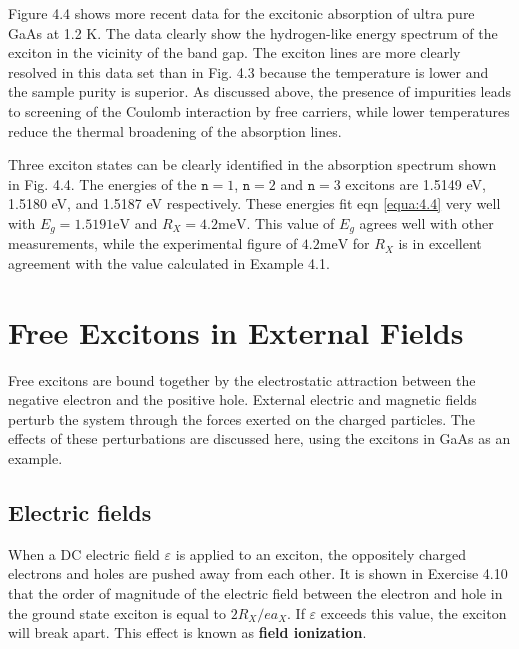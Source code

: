 \documentclass[12pt]{book}
\begin{document}
Figure 4.4 shows more recent data for the excitonic absorption of ultra pure GaAs at 1.2 K. The data clearly show the hydrogen-like energy spectrum of the exciton in the vicinity of the band gap. The exciton lines are more clearly resolved in this data set than in Fig. 4.3 because the temperature is lower and the sample purity is superior. As discussed above, the presence of impurities leads to screening of the Coulomb interaction by free carriers, while lower temperatures reduce the thermal broadening of the absorption lines.

Three exciton states can be clearly identified in the absorption spectrum shown in Fig. 4.4. The energies of the $\texttt{n} = 1$, $\texttt{n} = 2$ and $\texttt{n} = 3$ excitons are 1.5149 eV, 1.5180 eV, and 1.5187 eV respectively. These energies fit eqn \ref{equa:4.4} very well with $E_g=1.5191 \mathrm{eV}$ and $R_X = 4.2 \mathrm{meV}$. This value of $E_g$ agrees well with other measurements, while the experimental figure of $4.2 \mathrm{meV}$ for $R_X$ is in excellent agreement with the value calculated in Example 4.1.


\section{Free Excitons in External Fields}

Free excitons are bound together by the electrostatic attraction between the negative electron and the positive hole. External electric and magnetic fields perturb the system through the forces exerted on the charged particles. The effects of these perturbations are discussed here, using the excitons in GaAs as an example.

\subsection{Electric fields}

When a DC electric field $\varepsilon$ is applied to an exciton, the oppositely charged electrons and holes are pushed away from each other. It is shown in Exercise 4.10 that the order of magnitude of the electric field between the electron and hole in the ground state exciton is equal to $2R_X/ea_X$. If $\varepsilon$ exceeds this value, the exciton will break apart. This effect is known as \textbf{field ionization}.
\end{document}
